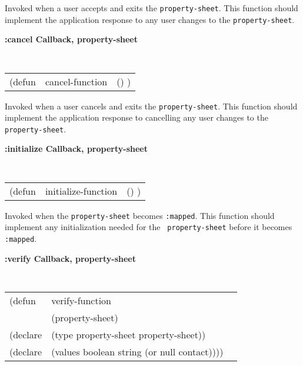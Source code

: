 \begin{flushright} \parbox[t]{6.125in}{
Invoked when a user accepts and exits the {\tt property-sheet}. 
This function should implement the application response to any user changes to
the {\tt property-sheet}.

}\end{flushright}

{\samepage
{\large {\bf :cancel \hfill Callback, property-sheet}} 
\begin{flushright} 
\parbox[t]{6.125in}{
\tt
\begin{tabular}{lll}
\raggedright
(defun & cancel-function & () )
\end{tabular}
\rm

}\end{flushright}}

\begin{flushright} \parbox[t]{6.125in}{
Invoked when a user cancels and exits the {\tt property-sheet}. 
This function should implement the application response to cancelling any user
changes to the {\tt property-sheet}.

}\end{flushright}

{\samepage
{\large {\bf :initialize \hfill Callback, property-sheet}} 
\begin{flushright} 
\parbox[t]{6.125in}{
\tt
\begin{tabular}{lll}
\raggedright
(defun & initialize-function & () )
\end{tabular}
\rm

}\end{flushright}}

\begin{flushright} \parbox[t]{6.125in}{
Invoked when the {\tt property-sheet} becomes {\tt :mapped}.
This function should implement any initialization needed for the {\tt
property-sheet} before it becomes {\tt :mapped}.
}\end{flushright}


{\samepage
{\large {\bf :verify \hfill Callback, property-sheet}} 
\begin{flushright} 
\parbox[t]{6.125in}{
\tt
\begin{tabular}{lll}
\raggedright
(defun & verify-function \\
& (property-sheet)\\
(declare & (type  property-sheet  property-sheet))\\
(declare & (values   boolean string (or null contact))))
\end{tabular}
\rm

}\end{flushright}}

